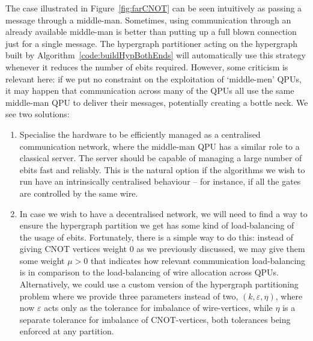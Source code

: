 The case illustrated in Figure~\ref{fig:farCNOT} can be seen intuitively as passing a message through a middle-man. Sometimes, using communication through an already available middle-man is better than putting up a full blown connection just for a single message. The hypergraph partitioner acting on the hypergraph built by Algorithm~\ref{code:buildHypBothEnds} will automatically use this strategy whenever it reduces the number of ebits required. However, some criticism is relevant here: if we put no constraint on the exploitation of `middle-men' QPUs, it may happen that communication across many of the QPUs all use the same middle-man QPU to deliver their messages, potentially creating a bottle neck. We see two solutions:


\begin{enumerate}
\item Specialise the hardware to be efficiently managed as a centralised communication network, where the middle-man QPU has a similar role to a classical server. The server should be capable of managing a large number of ebits fast and reliably. This is the natural option if the algorithms we wish to run have an intrinsically centralised behaviour -- for instance, if all the gates are controlled by the same wire.

\item In case we wish to have a decentralised network, we will need to find a way to ensure the hypergraph partition we get has some kind of load-balancing of the usage of ebits. Fortunately, there is a simple way to do this: instead of giving CNOT vertices weight \(0\) as we previously discussed, we may give them some weight \(\mu > 0\) that indicates how relevant communication load-balancing is in comparison to the load-balancing of wire allocation across QPUs. Alternatively, we could use a custom version of the hypergraph partitioning problem where we provide three parameters instead of two, \((k,\varepsilon,\eta)\), where now \(\varepsilon\) acts only as the tolerance for imbalance of wire-vertices, while \(\eta\) is a separate tolerance for imbalance of CNOT-vertices, both tolerances being enforced at any partition.
\end{enumerate}

